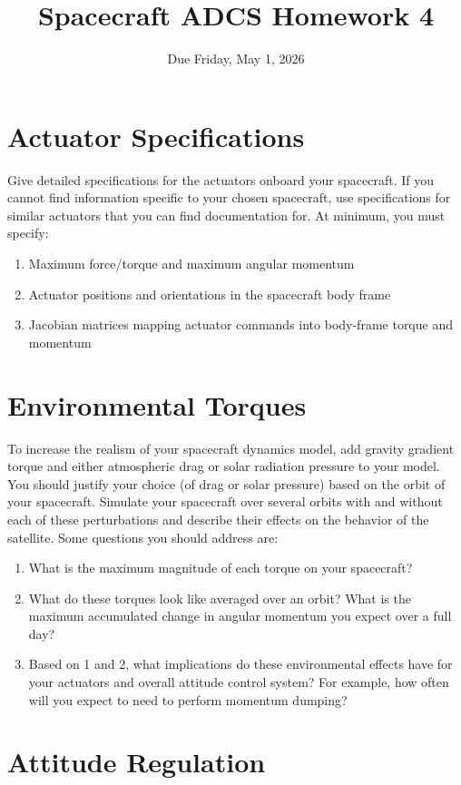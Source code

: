 \documentclass[11pt,letterpaper]{article}
\title{Spacecraft ADCS Homework 4}
\author{Due Friday, May 1, 2026}
\date{}
\begin{document}
\maketitle

\section{Actuator Specifications}

Give detailed specifications for the actuators onboard your spacecraft. If you cannot find information specific to your chosen spacecraft, use specifications for similar actuators that you can find documentation for. At minimum, you must specify:
\begin{enumerate}
	\item Maximum force/torque and maximum angular momentum
	\item Actuator positions and orientations in the spacecraft body frame
	\item Jacobian matrices mapping actuator commands into body-frame torque and momentum
\end{enumerate}

\section{Environmental Torques}

To increase the realism of your spacecraft dynamics model, add gravity gradient torque and either atmospheric drag or solar radiation pressure to your model. You should justify your choice (of drag or solar pressure) based on the orbit of your spacecraft. Simulate your spacecraft over several orbits with and without each of these perturbations and describe their effects on the behavior of the satellite. Some questions you should address are:
\begin{enumerate}
	\item What is the maximum magnitude of each torque on your spacecraft?
	\item What do these torques look like averaged over an orbit? What is the maximum accumulated change in angular momentum you expect over a full day?
	\item Based on 1 and 2, what implications do these environmental effects have for your actuators and overall attitude control system? For example, how often will you expect to need to perform momentum dumping?
\end{enumerate}

\section{Attitude Regulation}
\end{document}
